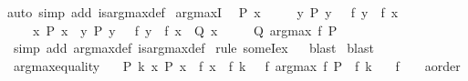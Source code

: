 \begin{isabellebody}
%
\isadelimproof
%
\endisadelimproof
%
\isatagproof
{}\isamarkupfalse%
{\isacharparenleft}{\kern0pt}auto\ simp\ add{\isacharcolon}{\kern0pt}\ is{\isacharunderscore}{\kern0pt}arg{\isacharunderscore}{\kern0pt}max{\isacharunderscore}{\kern0pt}def{\isacharparenright}{\kern0pt}%
\endisatagproof
{\isafoldproof}%
%
\isadelimproof
\isanewline
%
\endisadelimproof
\isanewline
{}\isamarkupfalse%
\ arg{\isacharunderscore}{\kern0pt}maxI{\isacharcolon}{\kern0pt}\isanewline
\ \ {\isachardoublequoteopen}P\ x\ {\isasymLongrightarrow}\isanewline
\ \ \ \ {\isacharparenleft}{\kern0pt}{\isasymAnd}y{\isachardot}{\kern0pt}\ P\ y\ {\isasymLongrightarrow}\ {\isasymnot}\ f\ y\ {\isachargreater}{\kern0pt}\ f\ x{\isacharparenright}{\kern0pt}\ {\isasymLongrightarrow}\isanewline
\ \ \ \ {\isacharparenleft}{\kern0pt}{\isasymAnd}x{\isachardot}{\kern0pt}\ P\ x\ {\isasymLongrightarrow}\ {\isasymforall}y{\isachardot}{\kern0pt}\ P\ y\ {\isasymlongrightarrow}\ {\isasymnot}\ f\ y\ {\isachargreater}{\kern0pt}\ f\ x\ {\isasymLongrightarrow}\ Q\ x{\isacharparenright}{\kern0pt}\ {\isasymLongrightarrow}\isanewline
\ \ \ \ Q\ {\isacharparenleft}{\kern0pt}arg{\isacharunderscore}{\kern0pt}max\ f\ P{\isacharparenright}{\kern0pt}{\isachardoublequoteclose}\isanewline
%
\isadelimproof
%
\endisadelimproof
%
\isatagproof
{}\isamarkupfalse%
\ {\isacharparenleft}{\kern0pt}simp\ add{\isacharcolon}{\kern0pt}\ arg{\isacharunderscore}{\kern0pt}max{\isacharunderscore}{\kern0pt}def\ is{\isacharunderscore}{\kern0pt}arg{\isacharunderscore}{\kern0pt}max{\isacharunderscore}{\kern0pt}def{\isacharparenright}{\kern0pt}\isanewline
{}\isamarkupfalse%
\ {\isacharparenleft}{\kern0pt}rule\ someI{}{\isacharunderscore}{\kern0pt}ex{\isacharparenright}{\kern0pt}\isanewline
\ \isamarkupfalse%
\ blast\isanewline
{}\isamarkupfalse%
\ blast\isanewline
{}\isamarkupfalse%
%
\endisatagproof
{\isafoldproof}%
%
\isadelimproof
\isanewline
%
\endisadelimproof
\isanewline
{}\isamarkupfalse%
\ arg{\isacharunderscore}{\kern0pt}max{\isacharunderscore}{\kern0pt}equality{\isacharcolon}{\kern0pt}\isanewline
\ \ {\isachardoublequoteopen}{\isasymlbrakk}\ P\ k{\isacharsemicolon}{\kern0pt}\ {\isasymAnd}x{\isachardot}{\kern0pt}\ P\ x\ {\isasymLongrightarrow}\ f\ x\ {\isasymle}\ f\ k\ {\isasymrbrakk}\ {\isasymLongrightarrow}\ f\ {\isacharparenleft}{\kern0pt}arg{\isacharunderscore}{\kern0pt}max\ f\ P{\isacharparenright}{\kern0pt}\ {\isacharequal}{\kern0pt}\ f\ k{\isachardoublequoteclose}\isanewline
\ \ \ f\ {\isacharcolon}{\kern0pt}{\isacharcolon}{\kern0pt}\ {\isachardoublequoteopen}{\isacharunderscore}{\kern0pt}\ {\isasymRightarrow}\ {\isacharprime}{\kern0pt}a{\isacharcolon}{\kern0pt}{\isacharcolon}{\kern0pt}order{\isachardoublequoteclose}\isanewline

\end{isabellebody}
